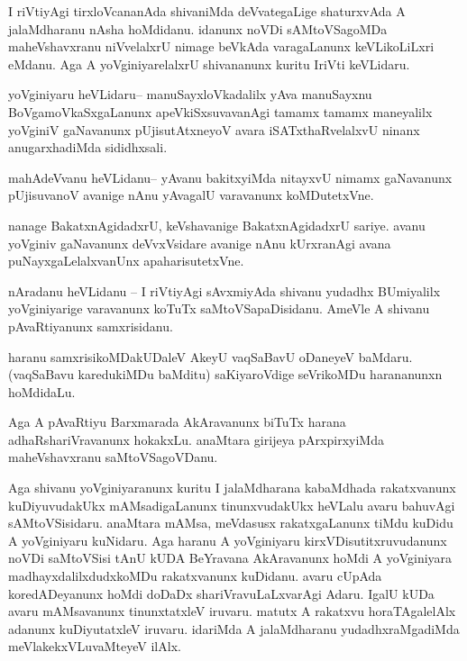 \documentclass{article}
\begin{document}
\begin{mn}%
I riVtiyAgi tirxloVcananAda shivaniMda deVvategaLige shaturxvAda A jalaMdharanu nAsha 
hoMdidanu. idanunx noVDi sAMtoVSagoMDa maheVshavxranu niVvelalxrU nimage beVkAda 
varagaLanunx keVLikoLiLxri eMdanu. Aga A yoVginiyarelalxrU shivananunx kuritu IriVti 
keVLidaru.
\end{mn}

\begin{mn}%
yoVginiyaru heVLidaru-- manuSayxloVkadalilx yAva manuSayxnu BoVgamoVkaSxgaLanunx 
apeVkiSxsuvavanAgi tamamx tamamx maneyalilx yoVginiV gaNavanunx pUjisutAtxneyoV avara 
iSATxthaRvelalxvU ninanx anugarxhadiMda sididhxsali.
\end{mn}

\begin{mn}%
mahAdeVvanu heVLidanu-- yAvanu bakitxyiMda nitayxvU nimamx gaNavanunx pUjisuvanoV avanige 
nAnu yAvagalU varavanunx koMDutetxVne.
\end{mn}

\begin{mn}%
nanage BakatxnAgidadxrU, keVshavanige BakatxnAgidadxrU sariye. avanu yoVginiv gaNavanunx 
deVvxVsidare avanige nAnu kUrxranAgi avana puNayxgaLelalxvanUnx apaharisutetxVne.
\end{mn}

\begin{mn}%
nAradanu heVLidanu -- I riVtiyAgi sAvxmiyAda shivanu yudadhx BUmiyalilx yoVginiyarige 
varavanunx koTuTx saMtoVSapaDisidanu. AmeVle A shivanu pAvaRtiyanunx samxrisidanu.
\end{mn}

\begin{mn}%
haranu samxrisikoMDakUDaleV AkeyU vaqSaBavU oDaneyeV baMdaru. (vaqSaBavu karedukiMDu 
baMditu) saKiyaroVdige seVrikoMDu harananunxn hoMdidaLu. 
\end{mn}

\begin{mn}%
Aga A pAvaRtiyu Barxmarada AkAravanunx biTuTx harana adhaRshariVravanunx hokakxLu. anaMtara 
girijeya pArxpirxyiMda maheVshavxranu saMtoVSagoVDanu.
\end{mn}

\begin{mn}%
Aga shivanu yoVginiyaranunx kuritu I jalaMdharana kabaMdhada rakatxvanunx kuDiyuvudakUkx 
mAMsadigaLanunx tinunxvudakUkx heVLalu avaru bahuvAgi sAMtoVSisidaru. anaMtara mAMsa, 
meVdasusx rakatxgaLanunx tiMdu kuDidu A yoVginiyaru kuNidaru. Aga haranu A yoVginiyaru 
kirxVDisutitxruvudanunx noVDi saMtoVSisi tAnU kUDA BeYravana AkAravanunx hoMdi A yoVginiyara 
madhayxdalilxdudxkoMDu rakatxvanunx kuDidanu. avaru cUpAda koredADeyanunx hoMdi doDaDx 
shariVravuLaLxvarAgi Adaru. IgalU kUDa avaru mAMsavanunx tinunxtatxleV iruvaru. matutx A 
rakatxvu horaTAgalelAlx adanunx kuDiyutatxleV iruvaru. idariMda A jalaMdharanu 
yudadhxraMgadiMda meVlakekxVLuvaMteyeV ilAlx.
\end{mn}
\end{document}
